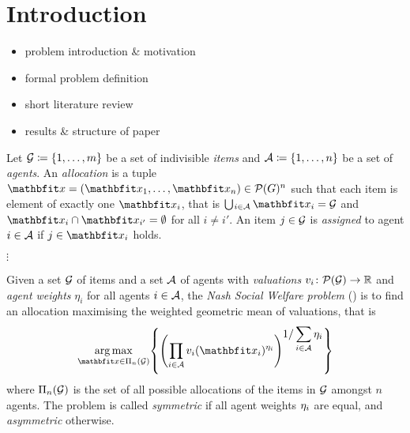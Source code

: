 \section{Introduction}
\label{sec:intro}

\begin{itemize}
	\item
	problem introduction \& motivation

	\item
	formal problem definition

	\item
	short literature review

	\item
	results \& structure of paper
\end{itemize}

\begin{definition}
	Let \(\mathcal{G} \coloneq \{1, \dots, m\}\) be a set of indivisible \emph{items} and \(\mathcal{A} \coloneq \{1, \dots, n\}\) be a set of \emph{agents}.
	An \emph{allocation} is a tuple \(\alloc = ( \alloc[1], \dots, \alloc[n] ) \in \powerset[G]^n\) such that each item is element of exactly one \(\alloc[i]\), that is \(\mathop{\bigcup\hspace{-1pt}_{i \in \agents}} \alloc[i] = \goods\) and \(\alloc[i] \cap \alloc[i'] = \emptyset\) for all \(i \neq i'\).
	An item \(j \in \mathcal{G}\) is \emph{assigned} to agent \(i \in \mathcal{A}\) if \(j \in \alloc[i]\) holds.
\end{definition}

\(\vdots\)

\begin{definition}
	Given a set \(\mathcal{G}\) of items and a set \(\mathcal{A}\) of agents with \emph{valuations} \(\valuations[i] \colon \powerset[\goods] \to \real\) and \emph{agent weights} \(\eta_i\) for all agents \(i \in \mathcal{A}\), the \emph{Nash Social Welfare problem} (\nsw) is to find an allocation maximising the weighted geometric mean of valuations, that is
	\begin{equation*}
		\argmax_{\alloc \in \allallocs{n}{\goods}} \left\{ \left( \prod_{i \in \agents} \valuations[i][\alloc[i]]^{\weight{i}} \right)^{\displaystyle 1 / \sum_{i \in \agents} \weight{i}} \right\}
	\end{equation*}
	where \(\Pi_{n}(\mathcal{G})\) is the set of all possible allocations of the items in \(\mathcal{G}\) amongst \(n\) agents.
	The problem is called \emph{symmetric} if all agent weights \(\eta_{i}\) are equal, and \emph{asymmetric} otherwise.
\end{definition}

